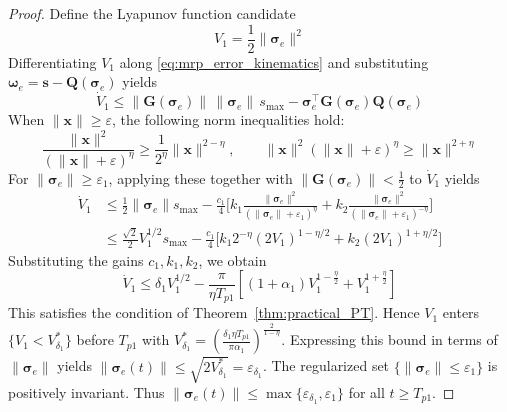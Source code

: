 \documentclass[journal]{new-aiaa}
\begin{document}
\begin{proof}
Define the Lyapunov function candidate
\begin{equation}
V_1 = \frac{1}{2}\|\boldsymbol{\sigma}_e\|^2
\end{equation}
Differentiating $V_1$ along \eqref{eq:mrp_error_kinematics} and
substituting $\boldsymbol{\omega}_e = \boldsymbol{s} - \boldsymbol{Q}(\boldsymbol{\sigma}_e)$ yields
\begin{equation}
\dot{V}_1 \le \|\boldsymbol{G}(\boldsymbol{\sigma}_e)\|\,\|\boldsymbol{\sigma}_e\|\,s_{\max}
- \boldsymbol{\sigma}_e^\top \boldsymbol{G}(\boldsymbol{\sigma}_e) \boldsymbol{Q}(\boldsymbol{\sigma}_e)
\end{equation}
When $\|\boldsymbol{x}\|\ge\varepsilon$, the following norm inequalities hold:
\begin{equation}
\frac{\|\boldsymbol{x}\|^2}{(\|\boldsymbol{x}\|+\varepsilon)^\eta} \ge \frac{1}{2^\eta} \|\boldsymbol{x}\|^{2-\eta},
\qquad
\|\boldsymbol{x}\|^2(\|\boldsymbol{x}\|+\varepsilon)^\eta \ge \|\boldsymbol{x}\|^{2+\eta}
\label{eq:norm_inequalities}
\end{equation}
For $\|\boldsymbol{\sigma}_e\| \ge \varepsilon_1$, applying these
together with $\|\boldsymbol{G}(\boldsymbol{\sigma}_e)\| < \tfrac{1}{2}$
to $\dot{V}_1$ yields
\begin{align}
\dot{V}_1
&\le \frac{1}{2}\|\boldsymbol{\sigma}_e\| s_{\max}
- \frac{c_1}{4}\Big[k_1\frac{\|\boldsymbol{\sigma}_e\|^2}{(\|\boldsymbol{\sigma}_e\|+\varepsilon_1)^\eta}
+ k_2\frac{\|\boldsymbol{\sigma}_e\|^2}{(\|\boldsymbol{\sigma}_e\|+\varepsilon_1)^{-\eta}}\Big] \nonumber \\
&\le \frac{\sqrt{2}}{2} V_1^{1/2} s_{\max}
- \frac{c_1}{4}\big[k_1 2^{-\eta} (2V_1)^{1-\eta/2} + k_2 (2V_1)^{1+\eta/2}\big]
\end{align}
Substituting the gains $c_1,k_1,k_2$, we obtain
\begin{equation}
\dot{V}_1 \le \delta_1 V_1^{1/2}
- \frac{\pi}{\eta T_{p1}}\left[(1+\alpha_1)V_1^{1-\frac{\eta}{2}} + V_1^{1+\frac{\eta}{2}}\right]
\label{eq:V1dot_final}
\end{equation}
This satisfies the condition of Theorem~\ref{thm:practical_PT}. Hence $V_1$ enters $\{V_1 < V^*_{\delta_1}\}$ before $T_{p1}$ with
$V^*_{\delta_1} = (\frac{\delta_1 \eta T_{p1}}{\pi \alpha_1})^{\frac{2}{1-\eta}}$.
Expressing this bound in terms of $\|\boldsymbol{\sigma}_e\|$ yields $\|\boldsymbol{\sigma}_e(t)\| \le \sqrt{2V^*_{\delta_1}} = \varepsilon_{\delta_1}$.
The regularized set $\{\|\boldsymbol{\sigma}_e\|\le\varepsilon_1\}$ is positively invariant.
Thus $\|\boldsymbol{\sigma}_e(t)\| \le \max\{\varepsilon_{\delta_1},\varepsilon_1\}$ for all $t\ge T_{p1}$.
\end{proof}
\end{document}
